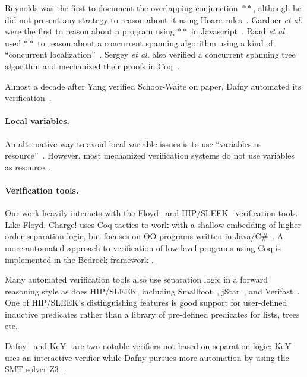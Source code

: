 Reynolds was the first to document the overlapping conjunction~$**$, although he did not present any strategy to reason about it using Hoare rules~\cite{rey-slnotes}.  Gardner \emph{et al.} were the first to reason about a program using $**$ in Javascript~\cite{GardnerMS12}.  Raad \emph{et al.} used $**$ to reason about a concurrent spanning algorithm using a kind of ``concurrent localization''~\cite{RaadVG15}.  Sergey \emph{et al.} also verified a concurrent spanning tree algorithm and mechanized their proofs in Coq~\cite{ilya-graphs}.

Almost a decade after Yang verified Schoor-Waite on paper, Dafny automated its verification~\cite{Leino10}.

\paragraph{Local variables.}
An alternative way to avoid local variable issues is to use ``variables as resource''~\cite{bornat:var}.
However, most mechanized verification systems do not use variables as resource~\cite{Beckert:2007,DistefanoP08,chin:hipsleek,Leino10,bengtson:charge,appel:programlogics}.

\paragraph{Verification tools.}
Our work heavily interacts with the Floyd~\cite{appel:programlogics} and HIP/SLEEK~\cite{chin:hipsleek} verification tools.  Like Floyd, Charge! uses Coq tactics to work with a shallow embedding of higher order separation logic, but focuses on OO programs written in Java/C\#~\cite{bengtson:charge}.  A  more automated approach to verification of low level programs using Coq is implemented in the Bedrock framework \cite{chlipala:bedrock}.

Many automated verification tools also use separation logic in a forward reasoning style as does HIP/SLEEK, including Smallfoot~\cite{berdine:smallfoot}, jStar~\cite{DistefanoP08}, and Verifast~\cite{jacobs:verifast}.  One of HIP/SLEEK's distinguishing features is good support for user-defined inductive predicates rather than a library of pre-defined predicates for lists, trees etc.

Dafny~\cite{Leino10} and KeY~\cite{Beckert:2007} are two notable verifiers not based on separation logic; KeY uses an interactive verifier while Dafny pursues more automation by using the SMT solver Z3~\cite{Moura2008}.


